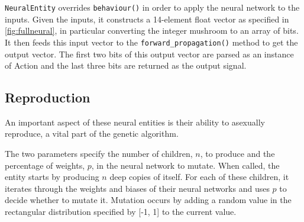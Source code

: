 \documentclass[12pt,a4paper]{report}
\begin{document}


    
    
    


\texttt{NeuralEntity} overrides \texttt{behaviour()} in order to apply the neural network to the inputs. Given the inputs, it constructs a 14-element float vector as specified in \cref{fig:fullneural}, in particular converting the integer mushroom to an array of bits. It then feeds this input vector to the \texttt{forward\_propagation()} method to get the output vector. The first two bits of this output vector are parsed as an instance of Action and the last three bits are returned as the output signal.

\subsection{Reproduction}

An important aspect of these neural entities is their ability to asexually reproduce, a vital part of the genetic algorithm.

The two parameters specify the number of children, $n$, to produce and the percentage of weights, $p$, in the neural network to mutate. When called, the entity starts by producing $n$ deep copies of itself. For each of these children, it iterates through the weights and biases of their neural networks and uses $p$ to decide whether to mutate it. Mutation occurs by adding a random value in the rectangular distribution specified by [-1, 1] to the current value.
\end{document}
